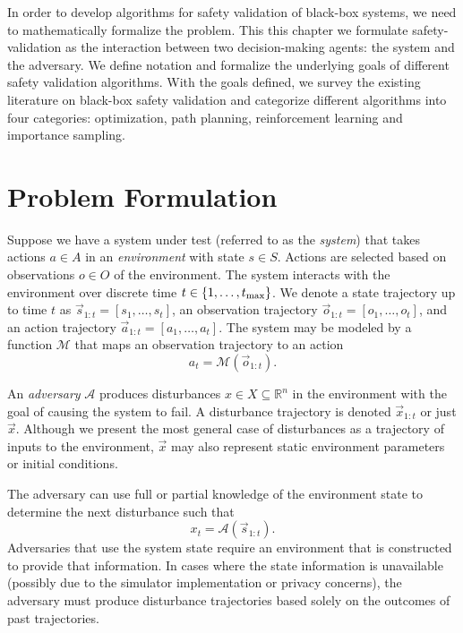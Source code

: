 In order to develop algorithms for safety validation of black-box systems, we need to mathematically formalize the problem. This this chapter we formulate safety-validation as the interaction between two decision-making agents: the system and the adversary. We define notation and formalize the underlying goals of different safety validation algorithms. With the goals defined, we survey the existing literature on black-box safety validation and categorize different algorithms into four categories: optimization, path planning, reinforcement learning and importance sampling. 

\section{Problem Formulation}

Suppose we have a system under test (referred to as the \emph{system}) that takes actions $a \in A$ in an \emph{environment} with state $s \in S$. Actions are selected based on observations $o \in O$ of the environment. The system interacts with the environment over discrete time $t \in \{1, \ldots, t_{\rm max}\}$. We denote a state trajectory up to time $t$ as $\vec{s}_{1:t} = [s_1, \ldots, s_t]$, an observation trajectory $\vec{o}_{1:t} = [o_1, \ldots, o_t]$, and an action trajectory $\vec{a}_{1:t} = [a_1, \ldots, a_t]$. The system may be modeled by a function $\mathcal{M}$ that maps an observation trajectory to an action
\begin{equation}
    a_t = \mathcal{M}(\vec{o}_{1:t}) \text{.} \label{eq:system} 
\end{equation}

An \emph{adversary} $\mathcal{A}$ produces disturbances $x \in X\subseteq \mathbb{R}^n$ in the environment with the goal of causing the system to fail. A disturbance trajectory is denoted $\vec{x}_{1:t}$ or just $\vec{x}$. Although we present the most general case of disturbances as a trajectory of inputs to the environment, $\vec{x}$ may also represent static environment parameters or initial conditions. 

The adversary can use full or partial knowledge of the environment state to determine the next disturbance such that
\begin{equation}
    x_t = \mathcal{A}(\vec{s}_{1:t}) \text{.} \label{eq:adversary}
\end{equation}
Adversaries that use the system state require an environment that is constructed to provide that information. In cases where the state information is unavailable (possibly due to the simulator implementation or privacy concerns), the adversary must produce disturbance trajectories based solely on the outcomes of past trajectories. 

